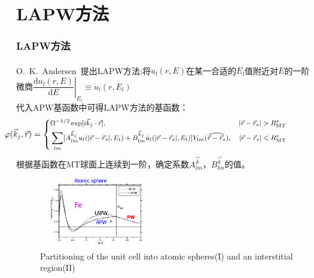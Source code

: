 \documentclass[cjk,slidestop,compress,mathserif,blue]{beamer}
\newcommand{\upcite}[1]{\hspace{0ex}\textsuperscript{\cite{#1}}} %
\begin{document}
\section{LAPW方法}
\frame
{
\frametitle{\textrm{LAPW}方法}
\textrm{O.~K.~Andersen~}提出\textrm{LAPW}方法\upcite{Singh_Book}:将$u_l(r,E)$在某一合适的$E_l$值附近对$E$的一阶微商{\footnotesize$\left.\dfrac{\textrm{d}u_l(r,E)}{\textrm{d}E}\right|_{E_l}\equiv\dot u_l(r,E_l)$}\\代入\textrm{APW}基函数中可得\textrm{LAPW}方法的基函数：
$${\footnotesize\hskip -50pt \varphi(\vec k_j,\vec r)=\left\{
  \begin{aligned}
    &\Omega^{-1/2}\exp[i\vec k_j\cdot\vec r],&|\vec r-\vec r_s|>R_{\mathrm{MT}}^s\\
    &\sum_{lm}[A^{\vec k_j}_{lm}u_l(|\vec r-\vec r_s|,E_l)+B^{\vec k_j}_{lm}\dot u_l(|\vec r-\vec r_s|,E_l)]Y_{lm}(\widehat{\vec r-\vec r_s}),&|\vec r-\vec r_s|\leqslant R_{\mathrm{MT}}^s
  \end{aligned}
\right.}$$
根据基函数在\textrm{MT}球面上连续到一阶，确定系数$A^{\vec k}_{lm}$，$B^{\vec k}_{lm}$的值。
\begin{figure}[h!]
\centering
\includegraphics[height=1.20in,width=1.98in,viewport=1 20 585 435,clip]{Figures/WIEN2k-LAPW.png}
\caption{\small \textrm{Partitioning of the unit cell into atomic spheres(I) and an interstitial region(II)}}%
\label{Muffin_tin}
\end{figure}
}
\end{document}
